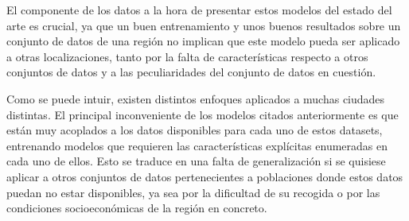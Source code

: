 \documentclass{uathesis-es}
\begin{document}
El componente de los datos a la hora de presentar estos modelos del estado del arte es crucial, ya que un buen entrenamiento y unos buenos resultados sobre un conjunto de datos de una región no implican que este modelo pueda ser aplicado a otras localizaciones, tanto por la falta de características respecto a otros conjuntos de datos y a las peculiaridades del conjunto de datos en cuestión.

Como se puede intuir, existen distintos enfoques aplicados a muchas ciudades distintas. El principal inconveniente de los modelos citados anteriormente es que están muy acoplados a los datos disponibles para cada uno de estos datasets, entrenando modelos que requieren las características explícitas enumeradas en cada uno de ellos. Esto se traduce en una falta de generalización si se quisiese aplicar a otros conjuntos de datos pertenecientes a poblaciones donde estos datos puedan no estar disponibles, ya sea por la dificultad de su recogida o por las condiciones socioeconómicas de la región en concreto.











\end{document}

